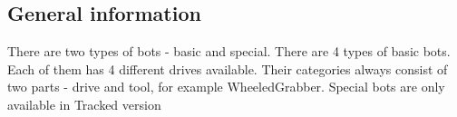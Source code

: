 
\subsection{General information}

There are two types of bots - basic and special.
There are 4 types of basic bots. Each of them has 4 different drives available.
Their categories always consist of two parts - drive and tool, for example WheeledGrabber.
Special bots are only available in Tracked version
